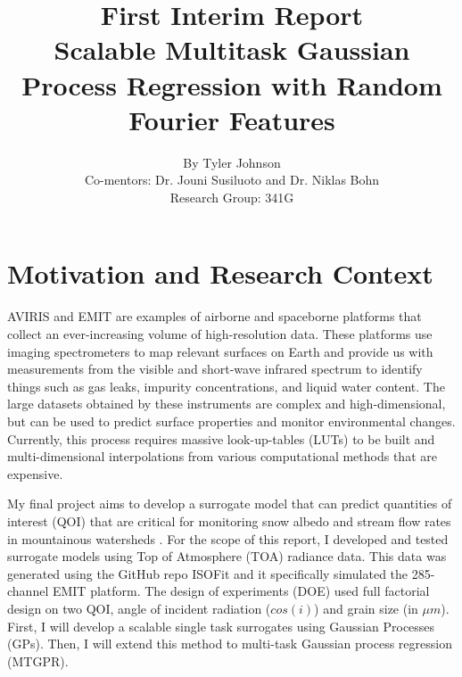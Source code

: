 \documentclass[11pt]{article}
\title{First Interim Report\\[0.4em]
\large Scalable Multitask Gaussian Process Regression with Random Fourier Features}
\author{
By Tyler Johnson\\
Co-mentors: Dr. Jouni Susiluoto and Dr. Niklas Bohn\\
Research Group: 341G
}
\date{%
}
\begin{document}
\maketitle

\begin{abstract}
\end{abstract}

\tableofcontents
\newpage

\section{Motivation and Research Context}
\label{sec:motivation}

AVIRIS and EMIT are examples of airborne and spaceborne platforms that collect an ever-increasing volume of high-resolution data. 
These platforms use imaging spectrometers to map relevant surfaces on Earth and provide us with measurements from the visible and short-wave infrared spectrum to identify things such as gas leaks, impurity concentrations, and liquid water content.
The large datasets obtained by these instruments are complex and high-dimensional, but can be used to predict surface properties and monitor environmental changes.
Currently, this process requires massive look-up-tables (LUTs) to be built and multi-dimensional interpolations from various computational methods that are expensive.

My final project aims to develop a surrogate model that can predict quantities of interest (QOI) that are critical for monitoring snow albedo and stream flow rates in mountainous watersheds \citep{Bohn03172025, Bohn25, COLEMAN2024114450}.
For the scope of this report, I developed and tested surrogate models using Top of Atmosphere (TOA) radiance data. This data was generated using the GitHub repo ISOFit and it specifically simulated the 285-channel EMIT platform. The design of experiments (DOE) used full factorial design on two QOI, angle of incident radiation ($cos(i)$) and grain size (in $\mu m$). First, I will develop a scalable single task surrogates using Gaussian Processes (GPs). Then, I will extend this method to multi-task Gaussian process regression (MTGPR).
\end{document}
